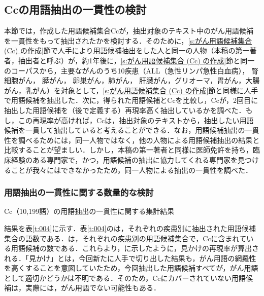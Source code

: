 \documentclass[japanese]{jnlp_1.4}
\def\maru#1{}
\begin{document}
\subsection{Ccの用語抽出の一貫性の検討}
\label{s:Ccの用語抽出の一貫性の検討}

本節では，作成した用語候補集合Ccが，抽出対象のテキスト中のがん用語候補を一貫性をもって抽出されたかを検討する．そのために，\ref{s:がん用語候補集合 (Cc) の作成}節で人手により用語候補抽出をした人と同一の人物（本稿の第一著者，抽出者と呼ぶ）が，約1年後に，\ref{s:がん用語候補集合 (Cc) の作成}節と同一のコーパスから，主要ながんのうち10疾患（ALL（急性リンパ急性白血病）， 腎細胞がん， 膵がん， 卵巣がん，肺がん， 肝臓がん，グリオーマ，胃がん，大腸がん，乳がん）を対象として，\ref{s:がん用語候補集合 (Cc) の作成}節と同様に人手で用語候補を抽出した．次に，得られた用語候補とCcを比較し，Ccが，2回目に抽出した用語候補を（後で定義する）再現率高く抽出しているかを調べた．もし，この再現率が高ければ，Ccは，抽出対象のテキストから，抽出したい用語候補を一貫して抽出していると考えることができる．なお，用語候補抽出の一貫性を調べるためには，同一人物ではなく，他の人物による用語候補抽出の結果と比較することが望ましい．しかし，本稿の第一著者と同様に医師免許を持ち，臨床経験のある専門家で，かつ，用語候補の抽出に協力してくれる専門家を見つけることが我々にはできなかったため，同一人物による抽出の一貫性を調べた．



\subsubsection{用語抽出の一貫性に関する数量的な検討}
\label{s:用語抽出の一貫性に関する数量的な検討}

\begin{table}[b]
 \caption{Cc（10,199語）の用語抽出の一貫性に関する集計結果}

 \label{t:004}
\end{table}

結果を表\ref{t:004}に示す．表\ref{t:004}の\maru{1}は，それぞれの疾患別に抽出された用語候補集合の語数である．\maru{2}は，それぞれの疾患別の用語候補集合で，Ccに含まれている用語候補の数である．これらより，\maru{3}に示したように，見かけの再現率が算出される．「見かけ」とは，今回新たに人手で切り出した結果も，がん用語の網羅性を高くすることを意図していたため，今回抽出した用語候補すべてが，がん用語として適切かどうかは不明である．そのため，Ccにカバーされていない用語候補は，実際には，がん用語でない可能性もある．
\end{document}
